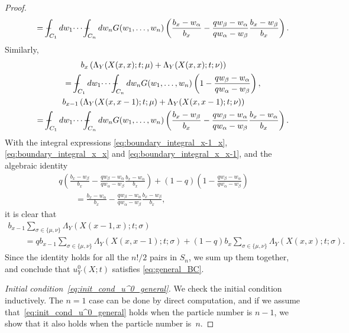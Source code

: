 \documentclass[pdftex]{sigma}
\numberwithin{equation}{section}
\def\Xint#1{\mathchoice
{\XXint\displaystyle\textstyle{#1}}%
{\XXint\textstyle\scriptstyle{#1}}%
{\XXint\scriptstyle\scriptscriptstyle{#1}}%
{\XXint\scriptscriptstyle\scriptscriptstyle{#1}}%
\!\int}
\def\XXint#1#2#3{{\setbox0=\hbox{$#1{#2#3}{\int}$}
\vcenter{\hbox{$#2#3$}}\kern-.5\wd0}}
\def\dashint{\Xint-}
\begin{document}
\begin{proof}
\begin{gather}
 \qquad {}=   \dashint_{C_1} dw_1 \dotsi \dashint_{C_n} dw_n G(w_1, \dotsc, w_n) \left( \frac{b_x - w_{\alpha}}{b_x} - \frac{qw_{\beta} - w_{\alpha}}{qw_{\alpha} - w_{\beta}} \frac{b_x - w_{\beta}}{b_x} \right).
\label{eq:boundary_integral_x-1_x}
 \end{gather}
 Similarly,
 \begin{gather}
 b_x \left( \Lambda_Y(X(x, x); t; \mu) + \Lambda_Y(X(x, x); t; \nu) \right) \nonumber\\
 \qquad{}{} = \dashint_{C_1} dw_1 \dotsi \dashint_{C_n} dw_n G(w_1, \dotsc, w_n) \left( 1 - \frac{qw_{\beta} - w_{\alpha}}{qw_{\alpha} - w_{\beta}} \right), \label{eq:boundary_integral_x_x}
 \\
 b_{x - 1} \left( \Lambda_Y(X(x, x - 1); t; \mu) + \Lambda_Y(X(x, x - 1); t; \nu) \right) \nonumber\\
 \qquad{} = \dashint_{C_1} dw_1 \dotsi \dashint_{C_n} dw_n G(w_1, \dotsc, w_n)
  \left( \frac{b_x - w_{\beta}}{b_x} - \frac{qw_{\beta} - w_{\alpha}}{qw_{\alpha} - w_{\beta}} \frac{b_x - w_{\alpha}}{b_x} \right).\label{eq:boundary_integral_x_x-1}
 \end{gather}
 With the integral expressions \eqref{eq:boundary_integral_x-1_x}, \eqref{eq:boundary_integral_x_x} and \eqref{eq:boundary_integral_x_x-1}, and the algebraic identity
 \begin{gather*}
 q \left( \frac{b_x - w_{\beta}}{b_x} - \frac{qw_{\beta} - w_{\alpha}}{qw_{\alpha} - w_{\beta}} \frac{b_x - w_{\alpha}}{b_x} \right) + (1 - q) \left( 1 - \frac{qw_{\beta} - w_{\alpha}}{qw_{\alpha} - w_{\beta}} \right) \\
 \qquad{} = \frac{b_x - w_{\alpha}}{b_x} - \frac{qw_{\beta} - w_{\alpha}}{qw_{\alpha} - w_{\beta}} \frac{b_x - w_{\beta}}{b_x},
 \end{gather*}
 it is clear that
 \begin{gather*}
 b_{x - 1} \sum_{\sigma \in \{ \mu, \nu \}} \Lambda_Y(X(x - 1, x); t; \sigma)   \\
 \qquad{} = q b_{x - 1} \sum_{\sigma \in \{ \mu, \nu \}} \Lambda_Y(X(x, x - 1); t; \sigma) + (1 - q) b_x \sum_{\sigma \in \{ \mu, \nu \}} \Lambda_Y(X(x, x); t; \sigma).
 \end{gather*}
 Since the identity holds for all the $n!/2$ pairs in $S_n$, we sum up them together, and conclude that $u^0_Y(X; t)$ satisf\/ies \eqref{eq:general_BC}.

\textit{Initial condition~\eqref{eq:init_cond_u^0_general}.}
 We check the initial condition inductively. The $n = 1$ case can be done by direct computation, and if we assume that~\eqref{eq:init_cond_u^0_general} holds when the particle number is $n - 1$, we show that it also holds when the particle number is~$n$.


\end{proof}
\end{document}
